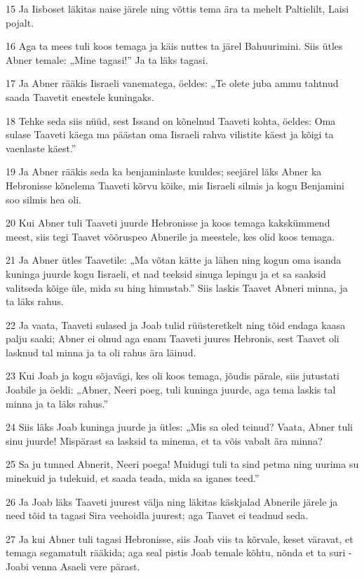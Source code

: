 \par 15 Ja Iisboset läkitas naise järele ning võttis tema ära ta mehelt Paltielilt, Laisi pojalt.
\par 16 Aga ta mees tuli koos temaga ja käis nuttes ta järel Bahuurimini. Siis ütles Abner temale: „Mine tagasi!” Ja ta läks tagasi.
\par 17 Ja Abner rääkis Iisraeli vanematega, öeldes: „Te olete juba ammu tahtnud saada Taavetit enestele kuningaks.
\par 18 Tehke seda siis nüüd, sest Issand on kõnelnud Taaveti kohta, öeldes: Oma sulase Taaveti käega ma päästan oma Iisraeli rahva vilistite käest ja kõigi ta vaenlaste käest.”
\par 19 Ja Abner rääkis seda ka benjaminlaste kuuldes; seejärel läks Abner ka Hebronisse kõnelema Taaveti kõrvu kõike, mis Iisraeli silmis ja kogu Benjamini soo silmis hea oli.
\par 20 Kui Abner tuli Taaveti juurde Hebronisse ja koos temaga kakskümmend meest, siis tegi Taavet võõruspeo Abnerile ja meestele, kes olid koos temaga.
\par 21 Ja Abner ütles Taavetile: „Ma võtan kätte ja lähen ning kogun oma isanda kuninga juurde kogu Iisraeli, et nad teeksid sinuga lepingu ja et sa saaksid valitseda kõige üle, mida su hing himustab.” Siis laskis Taavet Abneri minna, ja ta läks rahus.
\par 22 Ja vaata, Taaveti sulased ja Joab tulid rüüsteretkelt ning tõid endaga kaasa palju saaki; Abner ei olnud aga enam Taaveti juures Hebronis, sest Taavet oli lasknud tal minna ja ta oli rahus ära läinud.
\par 23 Kui Joab ja kogu sõjavägi, kes oli koos temaga, jõudis pärale, siis jutustati Joabile ja öeldi: „Abner, Neeri poeg, tuli kuninga juurde, aga tema laskis tal minna ja ta läks rahus.”
\par 24 Siis läks Joab kuninga juurde ja ütles: „Mis sa oled teinud? Vaata, Abner tuli sinu juurde! Mispärast sa lasksid ta minema, et ta võis vabalt ära minna?
\par 25 Sa ju tunned Abnerit, Neeri poega! Muidugi tuli ta sind petma ning uurima su minekuid ja tulekuid, et saada teada, mida sa iganes teed.”
\par 26 Ja Joab läks Taaveti juurest välja ning läkitas käskjalad Abnerile järele ja need tõid ta tagasi Sira veehoidla juurest; aga Taavet ei teadnud seda.
\par 27 Ja kui Abner tuli tagasi Hebronisse, siis Joab viis ta kõrvale, keset väravat, et temaga segamatult rääkida; aga seal pistis Joab temale kõhtu, nõnda et ta suri - Joabi venna Asaeli vere pärast.
